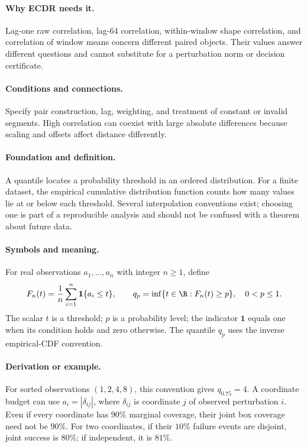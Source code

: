 \paragraph{Why ECDR needs it.}
Lag-one raw correlation, lag-64 correlation, within-window shape
correlation, and correlation of window means concern different paired
objects. Their values answer different questions and cannot substitute
for a perturbation norm or decision certificate.
\paragraph{Conditions and connections.}
Specify pair construction, lag, weighting, and treatment of constant or
invalid segments. High correlation can coexist with large absolute
differences because scaling and offsets affect distance differently.

\paragraph{Foundation and definition.}
A quantile locates a probability threshold in an ordered distribution.
For a finite dataset, the empirical cumulative distribution function
counts how many values lie at or below each threshold. Several
interpolation conventions exist; choosing one is part of a reproducible
analysis and should not be confused with a theorem about future data.
\paragraph{Symbols and meaning.}
For real observations $a_1,\ldots,a_n$ with integer $n\ge1$, define
\[
 F_n(t)=\frac1n\sum_{i=1}^{n}\mathbf1\{a_i\le t\},
 \qquad q_p=\inf\{t\in\R:F_n(t)\ge p\},\quad 0<p\le1.
\]
The scalar $t$ is a threshold; $p$ is a probability level; the indicator
$\mathbf1$ equals one when its condition holds and zero otherwise.
The quantile $q_p$ uses the inverse empirical-CDF convention.
\paragraph{Derivation or example.}
For sorted observations $(1,2,4,8)$, this convention gives
$q_{0.75}=4$. A coordinate budget can use
$a_i=|\delta_{ij}|$, where $\delta_{ij}$ is coordinate $j$ of
observed perturbation $i$. Even if every coordinate has $90\%$
marginal coverage, their joint box coverage need not be $90\%$.
For two coordinates, if their $10\%$ failure events are disjoint,
joint success is $80\%$; if independent, it is $81\%$.
